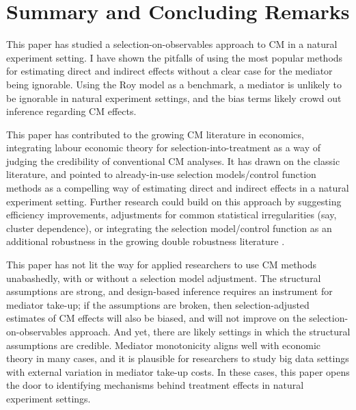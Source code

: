 \section{Summary and Concluding Remarks}
\label{sec:conclusion}

This paper has studied a selection-on-observables approach to CM in a natural experiment setting.
I have shown the pitfalls of using the most popular methods for estimating direct and indirect effects without a clear case for the mediator being ignorable.
Using the Roy model as a benchmark, a mediator is unlikely to be ignorable in natural experiment settings, and the bias terms likely crowd out inference regarding CM effects.

This paper has contributed to the growing CM literature in economics, integrating labour economic theory for selection-into-treatment as a way of judging the credibility of conventional CM analyses.
It has drawn on the classic literature, and pointed to already-in-use selection models/control function methods as a compelling way of estimating direct and indirect effects in a natural experiment setting.
Further research could build on this approach by suggesting efficiency improvements, adjustments for common statistical irregularities (say, cluster dependence), or integrating the selection model/control function as an additional robustness in the growing double robustness literature \citep{farbmacher2022causal,bia2024double}.

This paper has not lit the way for applied researchers to use CM methods unabashedly, with or without a selection model adjustment.
The structural assumptions are strong, and design-based inference requires an instrument for mediator take-up; if the assumptions are broken, then selection-adjusted estimates of CM effects will also be biased, and will not improve on the selection-on-observables approach.
And yet, there are likely settings in which the structural assumptions are credible.
Mediator monotonicity aligns well with economic theory in many cases, and it is plausible for researchers to study big data settings with external variation in mediator take-up costs.
In these cases, this paper opens the door to identifying mechanisms behind treatment effects in natural experiment settings.
